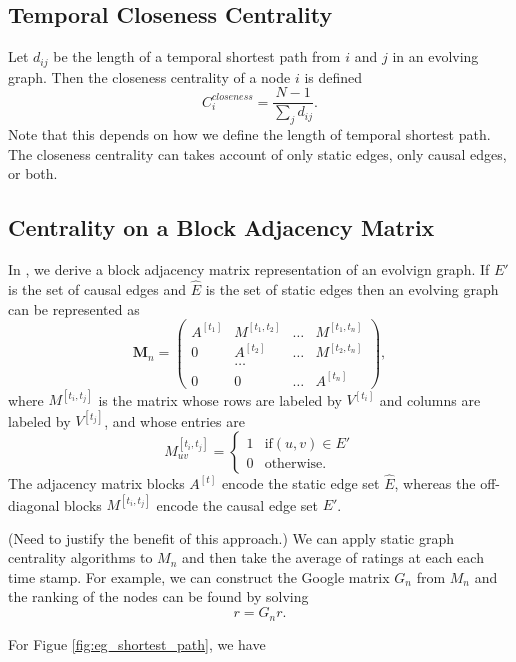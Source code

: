 \documentclass[12pt]{article}
\theoremstyle{definition}
\begin{document}
\subsection{Temporal Closeness Centrality}
\label{sec:temp-clos-centr}

Let $d_{ij}$ be the length of a temporal shortest path from $i$ and $j$ in an evolving graph. Then
the closeness centrality of a node $i$ is defined
$$
C_i^{closeness} = \frac{N-1}{\sum_j d_{ij}}.
$$
Note that this depends on how we define the length of temporal shortest path. The closeness centrality can takes account of only static edges, only causal edges, or both.


\subsection{Centrality on a Block Adjacency Matrix}
\label{sec:centr-block-adjac}

In \cite{chen16}, we derive a block adjacency matrix representation of an evolvign graph.
If $E'$ is the set of causal edges and $\hat E$ is the set of static edges then
an evolving graph can be represented as
$$
\bm M_n =
\begin{pmatrix}
A^{[t_1]} & M^{[t_1, t_2]} & \ldots & M^{[t_1, t_n]} \\
0         & A^{[t_2]} & \ldots & M^{[t_2, t_n]} \\
          & \ldots    &        &     \\
0         & 0         & \ldots & A^{[t_n]}
\end{pmatrix},
$$
where $M^{[t_i, t_j]}$ is the matrix whose rows are labeled by $V^{[t_i]}$ and columns are labeled by $V^{[t_j]}$, and whose entries are
$$
  M_{uv}^{[t_i, t_j]} =
  \begin{cases}
    1 & \mbox{if} (u, v) \in E' \\
    0 & \mbox{otherwise}.
  \end{cases}
$$
The adjacency matrix blocks $A^{[t]}$ encode the static edge set $\hat E$, whereas the off-diagonal blocks $M^{[t_i, t_j]}$ encode the causal edge set $E'$.

(Need to justify the benefit of this approach.)
We can apply static graph centrality algorithms to $M_n$ and then take the average of ratings at each each time stamp. For example, we can construct the Google matrix
$G_n$ from $M_n$ and the ranking of the nodes can be found by solving
$$
 r= G_n r.
$$

For Figue \ref{fig:eg_shortest_path}, we have
\end{document}
